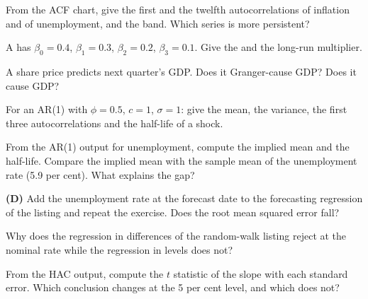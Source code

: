 \begin{exercise}[$\star$]\label{exo:b2:time-series:2}
From the ACF chart, give the first and the twelfth autocorrelations of inflation and of unemployment, and the band. Which
series is more persistent?
\end{exercise}

\begin{exercise}[$\star$]\label{exo:b2:time-series:3}
A  has $\beta_0 = 0.4$, $\beta_1 = 0.3$, $\beta_2 = 0.2$, $\beta_3 = 0.1$. Give the  and the long-run multiplier.
\end{exercise}

\begin{exercise}[$\star$]\label{exo:b2:time-series:4}
A share price predicts next quarter's GDP. Does it Granger-cause GDP? Does it cause GDP?
\end{exercise}

\begin{exercise}[$\star\star$]\label{exo:b2:time-series:5}
For an AR(1) with $\phi = 0.5$, $c = 1$, $\sigma = 1$: give the mean, the variance, the first three autocorrelations and
the half-life of a shock.
\end{exercise}

\begin{exercise}[$\star\star$]\label{exo:b2:time-series:6}
From the AR(1) output for unemployment, compute the implied mean and the half-life. Compare the implied mean with the
sample mean of the unemployment rate (5.9 per cent). What explains the gap?
\end{exercise}

\begin{exercise}[$\star\star$]\label{exo:b2:time-series:7}
\textbf{(D)} Add the unemployment rate at the forecast date to the forecasting regression of the listing and repeat the
exercise. Does the root mean squared error fall?
\end{exercise}

\begin{exercise}[$\star\star$]\label{exo:b2:time-series:8}
Why does the regression in differences of the random-walk listing reject at the nominal rate while the regression in
levels does not?
\end{exercise}

\begin{exercise}[$\star\star$]\label{exo:b2:time-series:9}
From the HAC output, compute the $t$ statistic of the slope with each standard error. Which conclusion changes at the
5 per cent level, and which does not?
\end{exercise}

